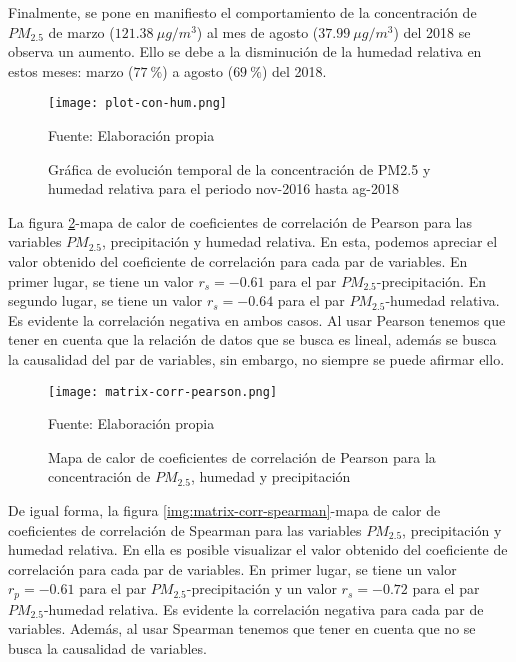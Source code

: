 \documentclass[a4paper,11pt]{article}
\begin{document}
Finalmente, se pone en manifiesto el comportamiento de la concentración de $PM_{2.5}$ de marzo ($121.38\ \mu g/m^3$) al mes de agosto ($37.99\ \mu g/m^3$) del 2018 se observa un aumento. Ello se debe a la disminución de la humedad relativa en estos meses: marzo ($77\ \%$) a agosto ($69\ \%$) del 2018.

\begin{figure}[H]
	\centering
     \texttt{[image: plot-con-hum.png]}
	\caption{Gráfica de evolución temporal de la concentración de PM2.5 y humedad relativa para el periodo nov-2016 hasta ag-2018}	
    \label{img:plot-con-hum}
    
    \centerline{Fuente: Elaboración propia }
\end{figure}

La figura \ref{img:matrix-corr-pearson}-mapa de calor de coeficientes de correlación de Pearson para las variables $PM_{2.5}$, precipitación y humedad relativa. En esta, podemos apreciar el valor obtenido del coeficiente de correlación para cada par de variables. En primer lugar, se tiene un valor $r_{s}=-0.61$ para el par $PM_{2.5}$-precipitación. En segundo lugar, se tiene un valor $r_{s}=-0.64$ para el par $PM_{2.5}$-humedad relativa. Es evidente la correlación negativa en ambos casos. Al usar Pearson tenemos que tener en cuenta que la relación de datos que se busca es lineal, además se busca la causalidad del par de variables, sin embargo, no siempre se puede afirmar ello.

\begin{figure}[H]
	\centering
     \texttt{[image: matrix-corr-pearson.png]}
	\caption{Mapa de calor de coeficientes de correlación de Pearson para la concentración de $PM_{2.5}$, humedad y precipitación}	
    \label{img:matrix-corr-pearson}
    
    \centerline{Fuente: Elaboración propia }
\end{figure}

De igual forma, la figura \ref{img:matrix-corr-spearman}-mapa de calor de coeficientes de correlación de Spearman para las variables $PM_{2.5}$, precipitación y humedad relativa. En ella es posible visualizar el valor obtenido del coeficiente de correlación para cada par de variables. En primer lugar, se tiene un valor $r_{p}=-0.61$ para el par $PM_{2.5}$-precipitación y un valor $r_{s}=-0.72$ para el par $PM_{2.5}$-humedad relativa. Es evidente la correlación negativa para cada par de variables. Además, al usar Spearman tenemos que tener en cuenta que no se busca la causalidad de variables.
\end{document}
